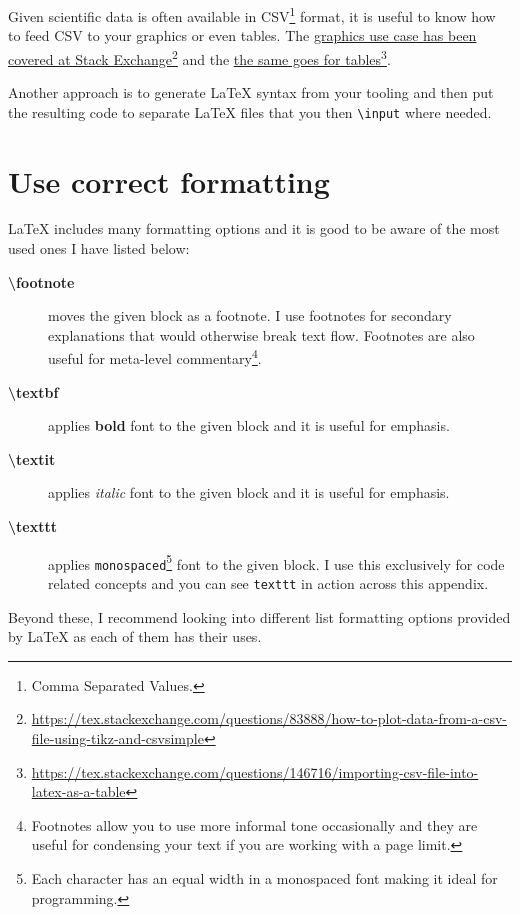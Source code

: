 Given scientific data is often available in CSV\footnote{Comma Separated Values.} format, it is useful to know how to feed CSV to your graphics or even tables. The \href{https://tex.stackexchange.com/questions/83888/how-to-plot-data-from-a-csv-file-using-tikz-and-csvsimple}{graphics use case has been covered at Stack Exchange}\footnote{\url{https://tex.stackexchange.com/questions/83888/how-to-plot-data-from-a-csv-file-using-tikz-and-csvsimple}} and the \href{https://tex.stackexchange.com/questions/146716/importing-csv-file-into-latex-as-a-table}{the same goes for tables}\footnote{\url{https://tex.stackexchange.com/questions/146716/importing-csv-file-into-latex-as-a-table}}.

Another approach is to generate LaTeX syntax from your tooling and then put the resulting code to separate LaTeX files that you then \texttt{\textbackslash input} where needed.

\section{Use correct formatting}

LaTeX includes many formatting options and it is good to be aware of the most used ones I have listed below:

\begin{description}
    \item[\textbf{\textbackslash footnote}] moves the given block as a footnote. I use footnotes for secondary explanations that would otherwise break text flow. Footnotes are also useful for meta-level commentary\footnote{Footnotes allow you to use more informal tone occasionally and they are useful for condensing your text if you are working with a page limit.}.
    \item[\textbf{\textbackslash textbf}] applies \textbf{bold} font to the given block and it is useful for emphasis.
    \item[\textbf{\textbackslash textit}] applies \textit{italic} font to the given block and it is useful for emphasis.
    \item[\textbf{\textbackslash texttt}] applies \texttt{monospaced}\footnote{Each character has an equal width in a monospaced font making it ideal for programming.} font to the given block. I use this exclusively for code related concepts and you can see \texttt{texttt} in action across this appendix.
\end{description}

Beyond these, I recommend looking into different list formatting options provided by LaTeX as each of them has their uses.

